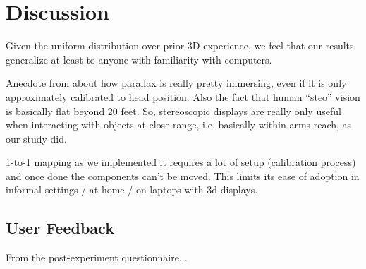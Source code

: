 \section{Discussion}\label{sec:discussion}

Given the uniform distribution over prior 3D experience, we feel that our
results generalize at least to anyone with familiarity with computers.

Anecdote from \cite{leewii} about how parallax is really pretty immersing,
even if it is only approximately calibrated to head position.  Also the fact
that human ``steo'' vision is basically flat beyond 20 feet.  So, stereoscopic
displays are really only useful when interacting with objects at close range,
i.e. basically within arms reach, as our study did.

1-to-1 mapping as we implemented it requires a lot of setup (calibration process) and once done the components can't be moved.  This limits its ease of adoption in informal settings / at home / on laptops with 3d displays.

\subsection{User Feedback}

From the post-experiment questionnaire...
